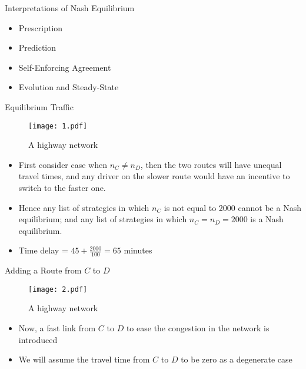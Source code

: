 \documentclass[10pt]{beamer}  %
\begin{document}
\begin{frame}{Interpretations of Nash Equilibrium}
    \begin{itemize}
        \item Prescription
        \item Prediction
        \item Self-Enforcing Agreement
        \item Evolution and Steady-State
    \end{itemize}
\end{frame}

\begin{frame}{Equilibrium Traffic}   %
    \begin{figure}
        \centering
        \texttt{[image: 1.pdf]}
        \caption{A highway network}
    \end{figure}
    \begin{itemize}
        \item First consider case when $n_C\neq n_D$, then the two routes will have unequal travel times, and any driver on the slower route would have an incentive to switch to the faster one. 
        \item Hence any list of strategies in which $n_C$ is not equal to 2000 cannot be a Nash equilibrium; and any list of strategies in which $n_C=n_D = 2000$ is a Nash equilibrium.
        \item Time delay = $45+\frac{2000}{100}=65$ minutes
    \end{itemize}
\end{frame}

\begin{frame}{Adding a Route from $C$ to $D$}
    \begin{figure}
        \centering
        \texttt{[image: 2.pdf]}
        \caption{A highway network}
    \end{figure}
    \begin{itemize}
        \item Now, a fast link from $C$ to $D$ to ease the congestion in the network is introduced
        \item We will assume the travel time from $C$ to $D$ to be zero as a degenerate case
    \end{itemize}
\end{frame}
\end{document}
